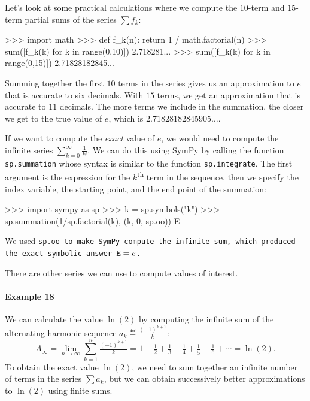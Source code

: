 			Let's look at some practical calculations where we compute
			the $10$-term and $15$-term partial sums of the series $\sum f_k$: 
	
			\begin{codeblock}[]
			>>> import math
			>>> def f_k(n): 
			        return 1 / math.factorial(n)
			>>> sum([f_k(k) for k in range(0,10)])
			2.718281...
			>>> sum([f_k(k) for k in range(0,15)])
			2.71828182845...
			\end{codeblock}
	
			\noindent
			Summing together the first $10$ terms in the series
			gives us an approximation to $e$ that is accurate to six decimals.
			With $15$ terms,
			we get an approximation that is accurate to $11$ decimals.
			The more terms we include in the summation,
			the closer we get to the true value of $e$,
			which is $2.71828182845905\ldots$.
	
			If we want to compute the \emph{exact} value of $e$,
			we would need to compute the infinite series $\sum_{k=0}^\infty \tfrac{1}{k!}$.
			We can do this using SymPy
			by calling the function \texttt{sp.summation}
			whose syntax is similar to the function \texttt{sp.integrate}.
			The first argument
			is the expression for the $k$\textsuperscript{th}
			term in the sequence,
			then we specify the index variable,
			the starting point,
			and the end point of the summation:
	
			\begin{codeblock}[]
			>>> import sympy as sp
			>>> k = sp.symbols("k")
			>>> sp.summation(1/sp.factorial(k), (k, 0, sp.oo))
			E
			\end{codeblock}
	
			\noindent
			We used \tt{sp.oo} to make SymPy compute the infinite sum,
			which produced the exact symbolic answer $\tt{E} = e$.
	
			There are other series we can use to compute values of interest.
	
			\paragraph{Example 18}
	
				We can calculate the value $\ln(2)$ 
				by computing the infinite sum of the alternating harmonic sequence
				$a_k \eqdef \tfrac{(-1)^{k+1}}{k}$:
				\[
					A_\infty
						= \lim_{n \to \infty} \sum_{k=1}^n \tfrac{(-1)^{k+1}}{k}
						 = 1 - \tfrac{1}{2} + \tfrac{1}{3} - \tfrac{1}{4} + \tfrac{1}{5} - \tfrac{1}{6}  + \cdots
						= \ln(2).
				\]
				To obtain the exact value $\ln(2)$,
				we need to sum together an infinite number of terms in the series $\sum a_k$,
				but we can obtain successively better approximations
				to $\ln(2)$ using finite sums.
	
